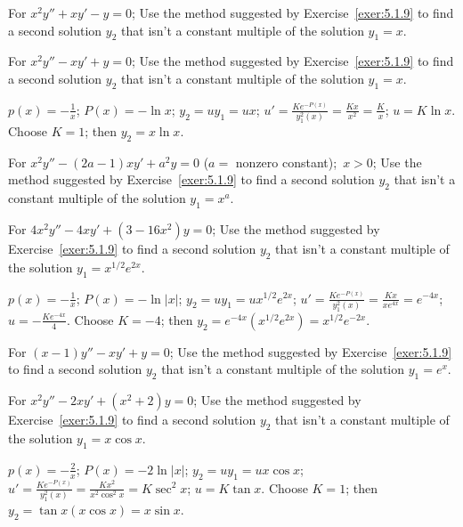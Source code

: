\documentclass{ximera}
\begin{document}
\begin{problem}\label{exer:5.1.13}
For $x^2y''+xy'-y=0$; Use the
method suggested by Exercise~\ref{exer:5.1.9} to find a second solution
$y_2$  that isn't  a constant multiple of the  solution $y_1=x$.
\end{problem}

\begin{problem}\label{exer:5.1.14}
For $x^2y''-xy'+y=0$; Use the
method suggested by Exercise~\ref{exer:5.1.9} to find a second solution
$y_2$  that isn't  a constant multiple of the  solution $y_1=x$.

\begin{solution}
    $p(x)=-\frac{1}{ x}$;\;
$P(x)=-\ln x$;\;
$y_2=uy_1=ux$;\;
$u'=\frac{Ke^{-P(x)}}{ y_1^2(x)}=\frac{Kx}{
x^2}=\frac{K}{ x}$;\;
$u=K\ln x$.
Choose $K=1$; then
$y_2=x\ln x$.
\end{solution}
\end{problem}


\begin{problem}\label{exer:5.1.15}
For $x^2y''-(2a-1)xy'+a^2y=0$\; ($a=$ nonzero constant);\, $x>0$; Use the
method suggested by Exercise~\ref{exer:5.1.9} to find a second solution
$y_2$  that isn't  a constant multiple of the  solution $y_1=x^a$.
\end{problem}

\begin{problem}\label{exer:5.1.16}
For $4x^2y''-4xy'+(3-16x^2)y=0$; Use the
method suggested by Exercise~\ref{exer:5.1.9} to find a second solution
$y_2$  that isn't  a constant multiple of the  solution $y_1=x^{1/2}e^{2x}$.

\begin{solution}
    $p(x)=-\frac{1}{ x}$;\;
$P(x)=-\ln|x|$;\;
$y_2=uy_1=ux^{1/2}e^{2x}$;\;
$u'=\frac{Ke^{-P(x)}}{ y_1^2(x)}=\frac{Kx}{ xe^{4x}}=e^{-4x}$;\;
$u=-\frac{Ke^{-4x}}{4}$.
Choose $K=-4$; then
$y_2=e^{-4x}(x^{1/2}e^{2x})=x^{1/2}e^{-2x}$.
\end{solution}
\end{problem}

\begin{problem}\label{exer:5.1.17}
For $(x-1)y''-xy'+y=0$; Use the
method suggested by Exercise~\ref{exer:5.1.9} to find a second solution
$y_2$  that isn't  a constant multiple of the  solution $y_1=e^x$.
\end{problem}

\begin{problem}\label{exer:5.1.18}
For $x^2y''-2xy'+(x^2+2)y=0$; Use the
method suggested by Exercise~\ref{exer:5.1.9} to find a second solution
$y_2$  that isn't  a constant multiple of the  solution $y_1=x\cos x$.

\begin{solution}
    $p(x)=-\frac{2}{ x}$;\;
$P(x)=-2\ln|x|$;\;
$y_2=uy_1=ux\cos x$;\;
$u'=\frac{Ke^{-P(x)}}{ y_1^2(x)}=\frac{Kx^2}{ x^2\cos^2
x}=K\sec^2x$;\;
$u=K\tan x$.
Choose $K=1$; then
$y_2=\tan x(x\cos x)=x\sin x$.
\end{solution}
\end{problem}
\end{document}
